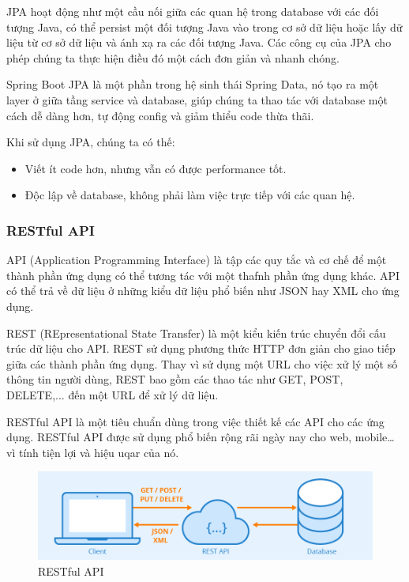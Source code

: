 JPA hoạt động như một cầu nối giữa các quan hệ trong database với các đối tượng Java, có thể persist một đối tượng Java vào trong cơ sở dữ liệu hoặc lấy dữ liệu từ cơ sở dữ liệu và ánh xạ ra các đối tượng Java. Các công cụ của JPA cho phép chúng ta thực hiện điều đó một cách đơn giản và nhanh chóng.\par

Spring Boot JPA là một phần trong hệ sinh thái Spring Data, nó tạo ra một layer ở giữa tầng service và database, giúp chúng ta thao tác với database một cách dễ dàng hơn, tự động config và giảm thiểu code thừa thãi.\par

Khi sử dụng JPA, chúng ta có thế:
\begin{itemize}
    \item Viết ít code hơn, nhưng vẫn có được performance tốt.
    \item Độc lập về database, không phải làm việc trực tiếp với các quan hệ.
\end{itemize}

\subsubsection{RESTful API}
API (Application Programming Interface) là tập các quy tắc và cơ chế để một thành phần ứng dụng có thể tương tác với một thafnh phần ứng dụng khác. API có thể trả về dữ liệu ở những kiểu dữ liệu phổ biến như JSON hay XML cho ứng dụng.\par

REST (REpresentational State Transfer) là một kiểu kiến trúc chuyển đổi cấu trúc dữ liệu cho API. REST sử dụng phương thức HTTP đơn giản cho giao tiếp giữa các thành phần ứng dụng. Thay vì sử dụng một URL cho việc xử lý một số thông tin người dùng, REST bao gồm các thao tác như GET, POST, DELETE,... đến một URL để xử lý dữ liệu.\par

RESTful API là một tiêu chuẩn dùng trong việc thiết kế các API cho các ứng dụng. RESTful API được sử dụng phổ biến rộng rãi ngày nay cho web, mobile… vì tính tiện lợi và hiệu uqar của nó.\par

\begin{figure}[H]
    \begin{center}
        \includegraphics[width=12cm]{Image/Technical/RESTful_API.png}
        \caption{RESTful API}
        \label{RESTfulAPI}
    \end{center}
\end{figure}

